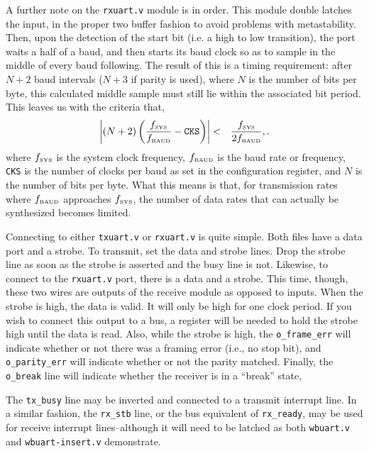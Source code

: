 \documentclass{gqtekspec}
\begin{document}
A further note on the {\tt rxuart.v} module is in order.  This module double
latches the input, in the proper two buffer fashion to avoid problems with
metastability.  Then, upon the detection of the start bit (i.e. a high to low
transition), the port waits a half of a baud, and then starts its baud clock
so as to sample in the middle of every baud following.  The result of this is
a timing requirement: after $N+2$ baud intervals ($N+3$ if parity is used),
where $N$ is the number of bits per byte, this calculated middle sample must
still lie within the associated bit period.  This leaves us with the criteria
that,
\begin{eqnarray}
\left|\left(N+2\right)
	\left(\frac{f_{\mbox{\tiny SYS}}}{f_{\mbox{\tiny BAUD}}}
		-{\mbox{\tt CKS}}\right)\right| 
	&<& \frac{f_{\mbox{\tiny SYS}}}{2f_{\mbox{\tiny BAUD}}},
	\label{eqn:baudlimit}.
\end{eqnarray}
where $f_{\mbox{\tiny SYS}}$ is the system clock frequency,
$f_{\mbox{\tiny BAUD}}$ is the baud rate or frequency,
{\tt CKS} is the number of clocks per baud as set in the configuration
register, and $N$ is the number of bits per byte.  What this means is that,
for transmission rates where $f_{\mbox{\tiny BAUD}}$ approaches
$f_{\mbox{\tiny SYS}}$, the number of data rates that can actually be
synthesized becomes limited.

Connecting to either {\tt txuart.v} or {\tt rxuart.v} is quite simple.  Both
files have a data port and a strobe.  To transmit, set the data and strobe
lines.  Drop the strobe line as soon as the strobe is asserted and the busy line
is not. 
Likewise, to connect to the {\tt rxuart.v} port, there is a data
and a strobe.  This time, though, these two wires are outputs of the receive
module as opposed to inputs.
When the strobe is high, the data is valid.  It will only be high for one
clock period.  If you wish to connect this output to a bus, a register will be
needed to hold the strobe high until the data is read.  Also, while the strobe
is high, the {\tt o\_frame\_err} will indicate whether or not there was a 
framing error (i.e., no stop bit), and {\tt o\_parity\_err} will indicate
whether or not the parity matched.  Finally, the {\tt o\_break} line will
indicate whether the receiver is in a ``break'' state,

The {\tt tx\_busy} line may be inverted and connected to a transmit interrupt
line.  In a similar fashion, the {\tt rx\_stb} line, or the bus equivalent of
{\tt rx\_ready}, may be used for receive interrupt lines--although it will need
to be latched as both {\tt wbuart.v} and {\tt wbuart-insert.v} demonstrate.
\end{document}
